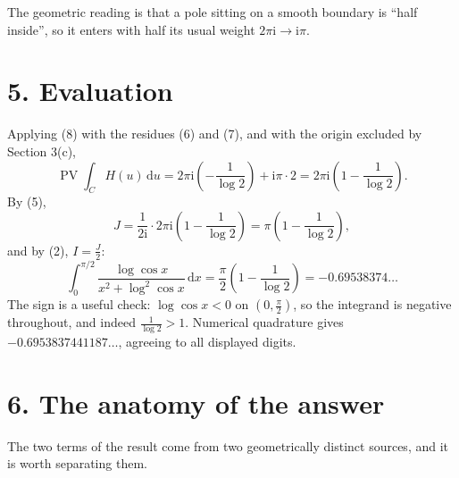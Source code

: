 \documentclass[12pt]{article}
\newcommand{\dd}{\,\mathrm{d}}
\newcommand{\ii}{\mathrm{i}}
\newcommand{\PV}{\operatorname{PV}}
\begin{document}
The geometric reading is that a pole sitting on a smooth boundary is
``half inside'', so it enters with half its usual weight
\(2\pi\ii\to\ii\pi\).

\begin{center}
\end{center}

\section*{5. Evaluation}

Applying (8) with the residues (6) and (7), and with the origin excluded
by Section 3(c),
\[
\PV\int_C H(u)\dd u
=2\pi\ii\left(-\frac1{\log2}\right)+\ii\pi\cdot2
=2\pi\ii\left(1-\frac1{\log2}\right).
\]
By (5),
\[
J=\frac1{2\ii}\cdot 2\pi\ii\left(1-\frac1{\log2}\right)
=\pi\left(1-\frac1{\log2}\right),
\]
and by (2), \(I=\frac J2\):
\[
\boxed{\displaystyle
\int_0^{\pi/2}
\frac{\log\cos x}{x^2+\log^2\cos x}\dd x
=\frac\pi2\left(1-\frac1{\log2}\right)
=-0.69538374\ldots}
\]
The sign is a useful check: \(\log\cos x<0\) on \((0,\frac\pi2)\), so the
integrand is negative throughout, and indeed \(\frac1{\log2}>1\).
Numerical quadrature gives \(-0.6953837441187\ldots\), agreeing to all
displayed digits.

\section*{6. The anatomy of the answer}

The two terms of the result come from two geometrically distinct sources,
and it is worth separating them.
\end{document}
